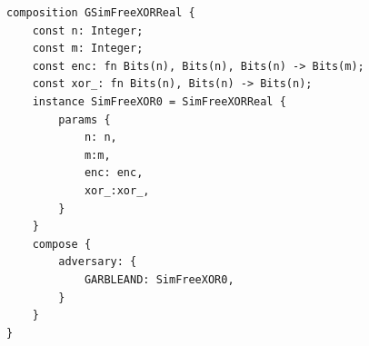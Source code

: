 \begin{longlisting}
\begin{verbatim}
composition GSimFreeXORReal {
    const n: Integer; 
    const m: Integer;  
    const enc: fn Bits(n), Bits(n), Bits(n) -> Bits(m); 
    const xor_: fn Bits(n), Bits(n) -> Bits(n);
    instance SimFreeXOR0 = SimFreeXORReal {
        params {
            n: n,
            m:m,
            enc: enc,
            xor_:xor_,
        }
    }
    compose {
        adversary: {
            GARBLEAND: SimFreeXOR0,
        }
    }
}
\end{verbatim}
\caption{Composition }
\label{lst:domino-composition-simfreexorreal}
\end{longlisting}